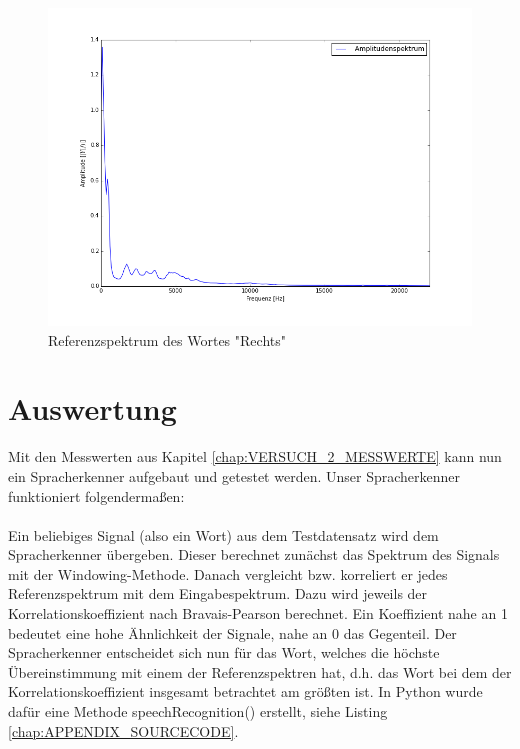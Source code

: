 \documentclass[12pt,oneside,a4paper]{report}
\begin{document}
\begin{figure}[H]
\centering\small
\includegraphics[scale=0.5]{src/ReferenzspektrumRechts.png}
\caption{Referenzspektrum des Wortes "Rechts"}
\label{fig:REF_RECHTS}
\end{figure}

\section{Auswertung}
\label{chap:VERSUCH_2_AUSWERTUNG}

Mit den Messwerten aus Kapitel \ref{chap:VERSUCH_2_MESSWERTE} kann nun ein Spracherkenner aufgebaut und getestet werden.
Unser Spracherkenner funktioniert folgendermaßen:

\paragraph{}

Ein beliebiges Signal (also ein Wort) aus dem Testdatensatz wird dem Spracherkenner übergeben. Dieser berechnet zunächst das Spektrum des Signals mit der Windowing-Methode.
Danach vergleicht bzw. korreliert er jedes Referenzspektrum mit dem Eingabespektrum. Dazu wird jeweils der Korrelationskoeffizient nach Bravais-Pearson berechnet. Ein Koeffizient nahe an 1 bedeutet eine hohe Ähnlichkeit der Signale, nahe an 0 das Gegenteil. Der Spracherkenner entscheidet sich nun für das Wort, welches die höchste Übereinstimmung mit einem der Referenzspektren hat, d.h. das Wort bei dem der Korrelationskoeffizient insgesamt betrachtet am größten ist.
In Python wurde dafür eine Methode speechRecognition() erstellt, siehe Listing \ref{chap:APPENDIX_SOURCECODE}.
\end{document}
